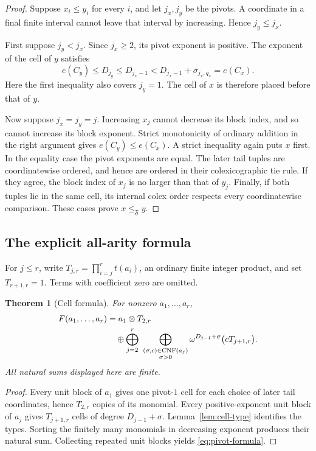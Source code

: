 \documentclass[11pt,letterpaper]{article}
\newtheorem{theorem}{Theorem}[section]
\theoremstyle{definition}
\theoremstyle{remark}
\newcommand{\FF}{\mathfrak F}
\newcommand{\CNF}{\operatorname{CNF}}
\begin{document}
\begin{proof}
Suppose $x_i\leq y_i$ for every $i$, and let $j_x,j_y$ be the pivots.
A coordinate in a final finite interval cannot leave that interval by
increasing. Hence $j_y\leq j_x$.

First suppose $j_y<j_x$. Since $j_x\geq2$, its pivot exponent is positive.
The exponent of the cell of $y$ satisfies
\[
 e(C_y)\leq D_{j_y}\leq D_{j_x-1}
          <D_{j_x-1}+\sigma_{j_x,q_x}=e(C_x).
\]
Here the first inequality also covers $j_y=1$. The cell of $x$ is therefore
placed before that of $y$.

Now suppose $j_x=j_y=j$. Increasing $x_j$ cannot decrease its block index,
and so cannot increase its block exponent. Strict monotonicity of ordinary
addition in the right argument gives $e(C_y)\leq e(C_x)$. A strict
inequality again puts $x$ first. In the equality case the pivot exponents
are equal. The later tail tuples are coordinatewise ordered, and hence are
ordered in their colexicographic tie rule. If they agree, the block index
of $x_j$ is no larger than that of $y_j$. Finally, if both tuples lie in
the same cell, its internal colex order respects every coordinatewise
comparison. These cases prove $x\leq_{\FF}y$.
\end{proof}

\subsection{The explicit all-arity formula}

For $j\leq r$, write
$T_{j,r}=\prod_{i=j}^{r}t(a_i)$, an ordinary finite integer product, and
set $T_{r+1,r}=1$. Terms with coefficient zero are omitted.

\begin{theorem}[Cell formula]\label{thm:formula}
For nonzero $a_1,\ldots,a_r$,
\begin{align}\label{eq:pivot-formula}
 F(a_1,\ldots,a_r)
 &=a_1\otimes T_{2,r}\notag\\
 &\quad\oplus
 \bigoplus_{j=2}^{r}
 \ \bigoplus_{\substack{(\sigma,c)\in\CNF(a_j)\\\sigma>0}}
      \omega^{D_{j-1}+\sigma}\bigl(cT_{j+1,r}\bigr).
\end{align}
All natural sums displayed here are finite.
\end{theorem}

\begin{proof}
Every unit block of $a_1$ gives one pivot-$1$ cell for each choice of later
tail coordinates, hence $T_{2,r}$ copies of its monomial. Every
positive-exponent unit block of $a_j$ gives $T_{j+1,r}$ cells of degree
$D_{j-1}+\sigma$. Lemma~\ref{lem:cell-type} identifies the types. Sorting
the finitely many monomials in decreasing exponent produces their natural
sum. Collecting repeated unit blocks yields \eqref{eq:pivot-formula}.
\end{proof}
\end{document}
